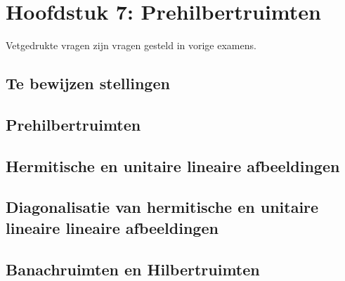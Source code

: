 \documentclass[12pt]{article}
\begin{document}
\date{}    
\maketitle
    \section*{Hoofdstuk 7: Prehilbertruimten}
    Vetgedrukte vragen zijn vragen gesteld in vorige examens.
    \setcounter{section}{7}
    \subsection*{Te bewijzen stellingen}
    \subsection{Prehilbertruimten}
    \subsection{Hermitische en unitaire lineaire afbeeldingen}
    \subsection{Diagonalisatie van hermitische en unitaire lineaire lineaire afbeeldingen}
    \subsection{Banachruimten en Hilbertruimten}
\end{document}
